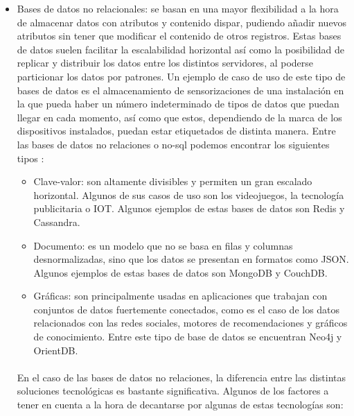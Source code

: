 \begin{itemize}
\item Bases de datos no relacionales: se basan en una mayor flexibilidad a la hora de almacenar datos con atributos y contenido dispar, pudiendo añadir nuevos atributos sin tener que modificar el contenido de otros registros. Estas bases de datos suelen facilitar la escalabilidad horizontal así como la posibilidad de replicar y distribuir los datos entre los distintos servidores, al poderse particionar los datos por patrones. Un ejemplo de caso de uso de este tipo de bases de datos es el almacenamiento de sensorizaciones de una instalación en la que pueda haber un número indeterminado de tipos de datos que puedan llegar en cada momento, así como que estos, dependiendo de la marca de los dispositivos instalados, puedan estar etiquetados de distinta manera. Entre las bases de datos no relaciones o no-sql podemos encontrar los siguientes tipos \citep{aws-nosql}:
\begin{itemize}
\item Clave-valor: son altamente divisibles y permiten un gran escalado horizontal. Algunos de sus casos de uso son los videojuegos, la tecnología publicitaria o IOT. Algunos ejemplos de estas bases de datos son Redis y Cassandra.
\item Documento: es un modelo que no se basa en filas y columnas desnormalizadas, sino que los datos se presentan en formatos como JSON. Algunos ejemplos de estas bases de datos son MongoDB y CouchDB.
\item Gráficas: son principalmente usadas en aplicaciones que trabajan con conjuntos de datos fuertemente conectados, como es el caso de los datos relacionados con las redes sociales, motores de recomendaciones y gráficos de conocimiento. Entre este tipo de base de datos se encuentran Neo4j y OrientDB.
\end{itemize}

\paragraph{}
En el caso de las bases de datos no relaciones, la diferencia entre las distintas soluciones tecnológicas es bastante significativa. Algunos de los factores a tener en cuenta a la hora de decantarse por algunas de estas tecnologías son:


\end{itemize}
